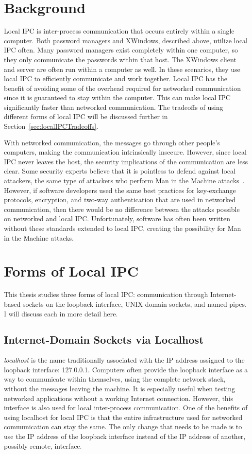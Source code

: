 \section{Background}
\label{sec:localIPCBackground}
Local IPC is inter-process communication that occurs entirely within a single computer.  Both password managers and XWindows, described above, utilize local IPC often.  Many password managers exist completely within one computer, so they only communicate the passwords within that host.  The XWindows client and server are often run within a computer as well.  In these scenarios, they use local IPC to efficiently communicate and work together.  Local IPC has the benefit of avoiding some of the overhead required for networked communication since it is guaranteed to stay within the computer.  This can make local IPC significantly faster than networked communication.  The tradeoffs of using different forms of local IPC will be discussed further in Section~\ref{sec:localIPCTradeoffs}.

With networked communication, the messages go through other people's computers, making the communication intrinsically insecure.  However, since local IPC never leaves the host, the security implications of the communication are less clear.  Some security experts believe that it is pointless to defend against local attackers, the same type of attackers who perform Man in the Machine attacks~\cite{MitMa}.  However, if software developers used the same best practices for key-exchange protocols, encryption, and two-way authentication that are used in networked communication, then there would be no difference between the attacks possible on networked and local IPC.  Unfortunately, software has often been written without these standards extended to local IPC, creating the possibility for Man in the Machine attacks.

\section{Forms of Local IPC}
\label{sec:formsOfLocalIPC}
This thesis studies three forms of local IPC: communication through Internet-based sockets on the loopback interface, UNIX domain sockets, and named pipes.  I will discuss each in more detail here.

\subsection{Internet-Domain Sockets via Localhost}
\label{sec:localhost}
\textit{localhost} is the name traditionally associated with the IP address assigned to the loopback interface: 127.0.0.1.  Computers often provide the loopback interface as a way to communicate within themselves, using the complete network stack, without the messages leaving the machine.  It is especially useful when testing networked applications without a working Internet connection.  However, this interface is also used for local inter-process communication.  One of the benefits of using localhost for local IPC is that the entire infrastructure used for networked communication can stay the same.  The only change that needs to be made is to use the IP address of the loopback interface instead of the IP address of another, possibly remote, interface.

